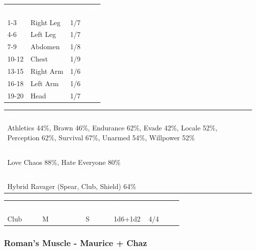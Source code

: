 \documentclass[letterpaper,serif]{rpg-module}
\begin{document}
\begin{tabularx}{\linewidth}{XXX}
\rowcolor{gray}
\textcolor{white}{\textbf{1d20}} & \textcolor{white}{\textbf{Location}} & \textcolor{white}{\textbf{AP/HP}} \\
1-3 & Right Leg & 1/7 \\
4-6 & Left Leg & 1/7 \\
7-9 & Abdomen & 1/8 \\
10-12 & Chest & 1/9 \\
13-15 & Right Arm & 1/6 \\
16-18 & Left Arm & 1/6 \\
19-20 & Head & 1/7 
\end{tabularx}

\begin{tabularx}{\linewidth}{X}
\rowcolor{gray}
\textcolor{white}{\textbf{Skills}} \\
Athletics 44\%, Brawn 46\%, Endurance 62\%, Evade 42\%, Locale 52\%, Perception 62\%, Survival 67\%, Unarmed 54\%, Willpower 52\%\\
\rowcolor{gray}
\textcolor{white}{\textbf{Passions}} \\
Love Chaos 88\%, Hate Everyone 80\% \\
\rowcolor{gray}
\textcolor{white}{\textbf{Combat Styles \& Weapons}} \\
Hybrid Ravager (Spear, Club, Shield) 64\%
\end{tabularx}

\begin{tabularx}{\linewidth}{XXXXX}
\rowcolor{gray}
\textcolor{white}{\textbf{Weapon}} & \textcolor{white}{\textbf{Size/Force}} & \textcolor{white}{\textbf{Reach}} & \textcolor{white}{\textbf{Damage}} & \textcolor{white}{\textbf{AP/HP}} \\
Club & M & S & 1d6+1d2 & 4/4
\end{tabularx}

\subsubsection{Roman's Muscle - Maurice + Chaz}

\lipsum[1]

\vspace{12pt}
\end{document}
